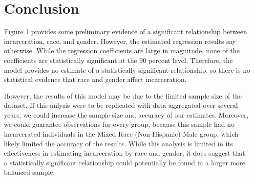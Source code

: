 \documentclass{article}
\begin{document}


\newpage

\section{Conclusion}

Figure 1 provides some preliminary evidence of a significant relationship between incarceration, race, and gender. However, the estimated regression results say otherwise. While the regression coefficients are large in magnitude, none of the coefficients are statistically significant at the 90 percent level. 
Therefore, the model provides no estimate of a statistically significant relationship, so there is no statistical evidence that race and gender affect incarceration. 

However, the results of this model may be due to the limited sample size of the dataset. If this anlysis were to be replicated with data aggregated over several years, we could increase the sample size and accuracy of our estimates. Moreover, we could guarantee observations for every group, because this sample had no incarcerated individuals in the Mixed Race (Non-Hispanic) Male group, which likely limited the accuracy of the results. 
While this analysis is limited in its effectiveness in estimating incarceration by race and gender, it does suggest that a statistically significant relationship could potentially be found in a larger more balanced sample. 
\end{document}
